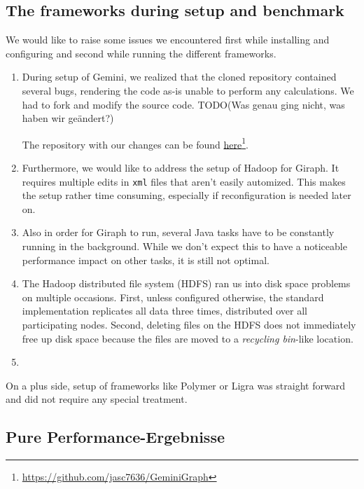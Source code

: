 

\subsection{The frameworks during setup and benchmark}
We would like to raise some issues we encountered first while installing and configuring and second while running the different frameworks.

\begin{enumerate}
	\item During setup of Gemini, we realized that the cloned repository contained several bugs, rendering the code as-is unable to perform any calculations. We had to fork and modify the source code. TODO(Was genau ging nicht, was haben wir geändert?)

	The repository with our changes can be found \href{https://github.com/jasc7636/GeminiGraph}{here}\footnote{\url{https://github.com/jasc7636/GeminiGraph}}.
	\item Furthermore, we would like to address the setup of Hadoop for Giraph. It requires multiple edits in \texttt{xml} files that aren't easily automized. This makes the setup rather time consuming, especially if reconfiguration is needed later on.
	\item Also in order for Giraph to run, several Java tasks have to be constantly running in the background. While we don't expect this to have a noticeable performance impact on other tasks, it is still not optimal.
	\item The Hadoop distributed file system (HDFS) ran us into disk space problems on multiple occasions. First, unless configured otherwise, the standard implementation replicates all data three times, distributed over all participating nodes. Second, deleting files on the HDFS does not immediately free up disk space because the files are moved to a \emph{recycling bin}-like location.

	\item 
\end{enumerate}


On a plus side, setup of frameworks like Polymer or Ligra was straight forward and did not require any special treatment. 





\subsection{Pure Performance-Ergebnisse}



